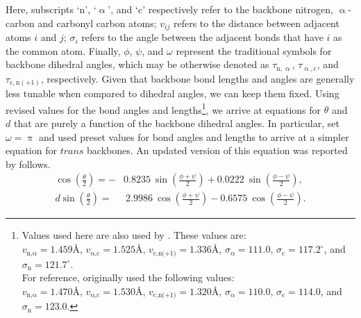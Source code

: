 \documentclass[fleqn,10pt]{wlpeerj} %
\begin{document}
Here, subscripts `$\textrm{n}$', `$\upalpha$', and `$\textrm{c}$' respectively refer to the backbone nitrogen, $\upalpha$-carbon and carbonyl carbon atoms; $v_{ij}$ refers to the distance between adjacent atoms $i$ and $j$; $\sigma_i$ refers to the angle between the adjacent bonds that have $i$ as the common atom. Finally, $\phi$, $\psi$, and $\omega$ represent the traditional  symbols for backbone dihedral angles, which may be otherwise denoted as $\tau_{\textrm{n},\upalpha}$, $\tau_{\upalpha,\textrm{c}}$, and $\tau_{\textrm{c},\textrm{n}(+1)}$, respectively. Given that backbone bond lengths and angles are generally less tunable when compared to dihedral angles, we can keep them fixed. Using revised values for the bond angles and lengths\footnote{Values used here are also used by \cite{Zacharias2013}. These values are: \\%
$v_{\textrm{n,}\upalpha} = 1.459\textrm{\AA}$,\hfill
$v_{\upalpha\textrm{,c}} = 1.525\textrm{\AA}$, \hfill
$v_\textrm{c,n(+1)} = 1.336\textrm{\AA}$, \hfill
$\sigma_\upalpha = 111.0$,\hfill
$\sigma_\textrm{c} = 117.2^\circ$, \hfill and \hfill
$\sigma_\textrm{n} = 121.7^\circ$. \hfill \\
For reference, \cite{Miyazawa1961} originally used the following values:\\ 
$v_{\textrm{n,}\upalpha} = 1.470\textrm{\AA}$,\hfill
$v_{\upalpha\textrm{,c}} = 1.530\textrm{\AA}$,\hfill 
$v_\textrm{c,n(+1)} = 1.320\textrm{\AA}$, \hfill
$\sigma_\upalpha = 110.0$,\hfill
$\sigma_\textrm{c} = 114.0$, \hfill and \hfill
$\sigma_\textrm{n} = 123.0$.}, 
we arrive at equations for $\theta$ and $d$ that are purely a function of the backbone dihedral angles. In particular, \cite{Miyazawa1961} set $\omega=\uppi$ and used preset values for bond angles and lengths to arrive at a simpler equation for $trans$ backbones. An updated version of this equation was reported by \cite{Zacharias2013} follows.
\begin{align}
\label{eqn:theta_trans}
\cos\left(\frac{\theta}{2}\right) =-&0.8235~\sin\left(\frac{\phi+\psi}{2}\right) 
                                    +0.0222~\sin\left(\frac{\phi-\psi}{2}\right),\\
\label{eqn:d_trans}
d \sin\left(\frac{\theta}{2}\right) =&~2.9986~\cos\left(\frac{\phi+\psi}{2}\right)
                                      -0.6575~\cos\left(\frac{\phi-\psi}{2}\right).
\end{align}
\end{document}
